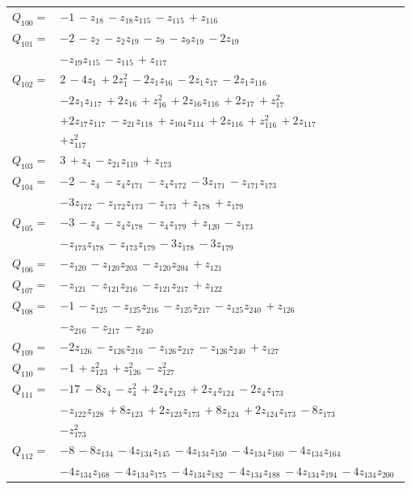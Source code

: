 \begin{longtable}{@{}r p{0.88\linewidth}@{}}
$Q_{100}=$ & $-1\,-z_{18}\,-z_{18}z_{115}\,-z_{115}\,+z_{116}$\\[5pt]
$Q_{101}=$ & $-2\,-z_{2}\,-z_{2}z_{19}\,-z_{9}\,-z_{9}z_{19}\,-2z_{19}$\\
 & $-z_{19}z_{115}\,-z_{115}\,+z_{117}$\\[5pt]
$Q_{102}=$ & $2\,-4z_{1}\,+2z_{1}^{2}\,-2z_{1}z_{16}\,-2z_{1}z_{17}\,-2z_{1}z_{116}$\\
 & $-2z_{1}z_{117}\,+2z_{16}\,+z_{16}^{2}\,+2z_{16}z_{116}\,+2z_{17}\,+z_{17}^{2}$\\
 & $+2z_{17}z_{117}\,-z_{21}z_{118}\,+z_{104}z_{114}\,+2z_{116}\,+z_{116}^{2}\,+2z_{117}$\\
 & $+z_{117}^{2}$\\[5pt]
$Q_{103}=$ & $3\,+z_{4}\,-z_{21}z_{119}\,+z_{173}$\\[5pt]
$Q_{104}=$ & $-2\,-z_{4}\,-z_{4}z_{171}\,-z_{4}z_{172}\,-3z_{171}\,-z_{171}z_{173}$\\
 & $-3z_{172}\,-z_{172}z_{173}\,-z_{173}\,+z_{178}\,+z_{179}$\\[5pt]
$Q_{105}=$ & $-3\,-z_{4}\,-z_{4}z_{178}\,-z_{4}z_{179}\,+z_{120}\,-z_{173}$\\
 & $-z_{173}z_{178}\,-z_{173}z_{179}\,-3z_{178}\,-3z_{179}$\\[5pt]
$Q_{106}=$ & $-z_{120}\,-z_{120}z_{203}\,-z_{120}z_{204}\,+z_{121}$\\[5pt]
$Q_{107}=$ & $-z_{121}\,-z_{121}z_{216}\,-z_{121}z_{217}\,+z_{122}$\\[5pt]
$Q_{108}=$ & $-1\,-z_{125}\,-z_{125}z_{216}\,-z_{125}z_{217}\,-z_{125}z_{240}\,+z_{126}$\\
 & $-z_{216}\,-z_{217}\,-z_{240}$\\[5pt]
$Q_{109}=$ & $-2z_{126}\,-z_{126}z_{216}\,-z_{126}z_{217}\,-z_{126}z_{240}\,+z_{127}$\\[5pt]
$Q_{110}=$ & $-1\,+z_{123}^{2}\,+z_{126}^{2}\,-z_{127}^{2}$\\[5pt]
$Q_{111}=$ & $-17\,-8z_{4}\,-z_{4}^{2}\,+2z_{4}z_{123}\,+2z_{4}z_{124}\,-2z_{4}z_{173}$\\
 & $-z_{122}z_{128}\,+8z_{123}\,+2z_{123}z_{173}\,+8z_{124}\,+2z_{124}z_{173}\,-8z_{173}$\\
 & $-z_{173}^{2}$\\[5pt]
$Q_{112}=$ & $-8\,-8z_{134}\,-4z_{134}z_{145}\,-4z_{134}z_{150}\,-4z_{134}z_{160}\,-4z_{134}z_{164}$\\
 & $-4z_{134}z_{168}\,-4z_{134}z_{175}\,-4z_{134}z_{182}\,-4z_{134}z_{188}\,-4z_{134}z_{194}\,-4z_{134}z_{200}$\\

\end{longtable}
